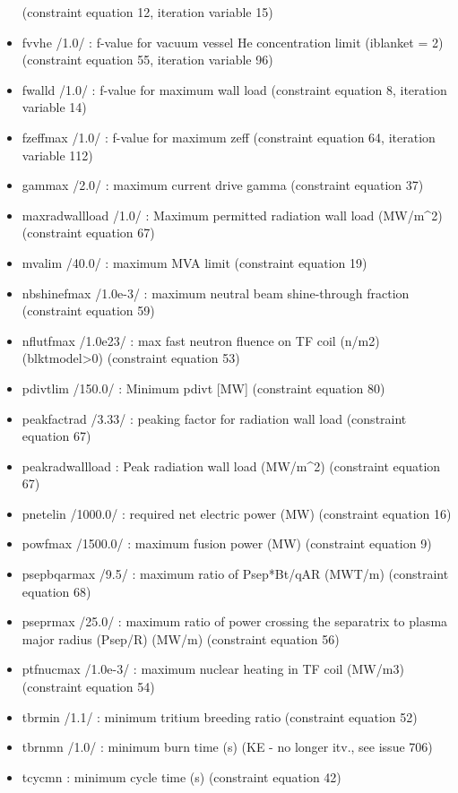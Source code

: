 \documentclass[]{article}
\begin{document}
\begin{itemize}
  (constraint equation 12, iteration variable 15)
\item
  fvvhe /1.0/ : f-value for vacuum vessel He concentration limit
  (iblanket = 2) (constraint equation 55, iteration variable 96)
\item
  fwalld /1.0/ : f-value for maximum wall load (constraint equation 8,
  iteration variable 14)
\item
  fzeffmax /1.0/ : f-value for maximum zeff (constraint equation 64,
  iteration variable 112)
\item
  gammax /2.0/ : maximum current drive gamma (constraint equation 37)
\item
  maxradwallload /1.0/ : Maximum permitted radiation wall load
  (MW/m\^{}2) (constraint equation 67)
\item
  mvalim /40.0/ : maximum MVA limit (constraint equation 19)
\item
  nbshinefmax /1.0e-3/ : maximum neutral beam shine-through fraction
  (constraint equation 59)
\item
  nflutfmax /1.0e23/ : max fast neutron fluence on TF coil (n/m2)
  (blktmodel\textgreater{}0) (constraint equation 53)
\item
  pdivtlim /150.0/ : Minimum pdivt {[}MW{]} (constraint equation 80)
\item
  peakfactrad /3.33/ : peaking factor for radiation wall load
  (constraint equation 67)
\item
  peakradwallload : Peak radiation wall load (MW/m\^{}2) (constraint
  equation 67)
\item
  pnetelin /1000.0/ : required net electric power (MW) (constraint
  equation 16)
\item
  powfmax /1500.0/ : maximum fusion power (MW) (constraint equation 9)
\item
  psepbqarmax /9.5/ : maximum ratio of Psep*Bt/qAR (MWT/m) (constraint
  equation 68)
\item
  pseprmax /25.0/ : maximum ratio of power crossing the separatrix to
  plasma major radius (Psep/R) (MW/m) (constraint equation 56)
\item
  ptfnucmax /1.0e-3/ : maximum nuclear heating in TF coil (MW/m3)
  (constraint equation 54)
\item
  tbrmin /1.1/ : minimum tritium breeding ratio (constraint equation 52)
\item
  tbrnmn /1.0/ : minimum burn time (s) (KE - no longer itv., see issue
  706)
\item
  tcycmn : minimum cycle time (s) (constraint equation 42)

\end{itemize}
\end{document}
